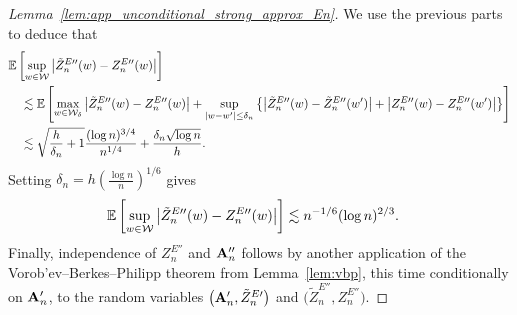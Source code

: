 \begin{proof}[Lemma~\ref{lem:app_unconditional_strong_approx_En}]
  We use the previous parts
  to deduce that
  \begin{align*}
    &\mathbb{E}\left[
      \sup_{w \in \mathcal{W}}
      \big|\tilde Z_n^{E\prime\prime}(w) - Z_n^{E\prime\prime}(w)\big|
    \right] \\
    &\quad\lesssim
    \mathbb{E}\left[
      \max_{w \in \mathcal{W}_\delta}
      \big|\tilde Z_n^{E\prime\prime}(w) - Z_n^{E\prime\prime}(w)\big|
      + \sup_{|w-w'| \leq \delta_n}
      \left\{ 
      \big|\tilde Z_n^{E\prime\prime}(w) - \tilde Z_n^{E\prime\prime}(w')\big|
      + \big|Z_n^{E\prime\prime}(w) - Z_n^{E\prime\prime}(w')\big|
      \right\}
    \right] \\
    &\quad\lesssim
    \sqrt{\frac{h}{\delta_n} + 1}
    \frac{(\log n)^{3/4}}{n^{1/4}}
    + \frac{\delta_n \sqrt{\log n}}{h}.
  \end{align*}
  Setting
  $\delta_n = h \left( \frac{\log n}{n} \right)^{1/6}$
  gives
  \begin{align*}
    \mathbb{E}\left[
      \sup_{w \in \mathcal{W}}
      \big|\tilde Z_n^{E\prime\prime}(w) - Z_n^{E\prime\prime}(w)\big|
    \right]
    &\lesssim
    n^{-1/6} (\log n)^{2/3}.
  \end{align*}
  Finally, independence of $Z_n^{E\dprime}$ and $\mathbf{A}_n''$
  follows by another application of
  the Vorob'ev--Berkes--Philipp theorem
  from Lemma~\ref{lem:vbp},
  this time conditionally on $\mathbf{A}_n'$,
  to the random variables
  $\big(\mathbf{A}_n', \tilde Z_n^{E\prime}\big)$
  and
  $\big(\tilde Z_n^{E\dprime}, Z_n^{E\dprime}\big)$.
\end{proof}

